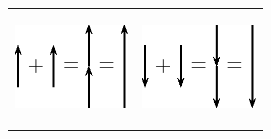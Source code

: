         \begin{center}
      
      \label{m38813*id188639}
      
    \noindent
      \tablelasttail{}
      \begin{xtabular*}{\mytablewidth}[t]{|p{10\mystarwidth}|p{10\mystarwidth}|}\hline
    
    
        
                  
    \setcounter{subfigure}{0}

\label{m38813*id188647}
    \begin{center}
    \label{m38813*id188647!!!underscore!!!media}\label{m38813*id188647!!!underscore!!!printimage}\includegraphics[width=3cm]{col11305.imgs/m38813_PG11C1_018.png} %
        
      \vspace{2pt}
    \vspace{.1in}
    
    \end{center}



    \addtocounter{footnote}{-0}
    
                 &
    
    
        
                  
    \setcounter{subfigure}{0}

\label{m38813*id188657}
    \begin{center}
    \label{m38813*id188657!!!underscore!!!media}\label{m38813*id188657!!!underscore!!!printimage}\includegraphics[width=3cm]{col11305.imgs/m38813_PG11C1_019.png} %
        

\end{center}
\end{xtabular*}
\end{center}
